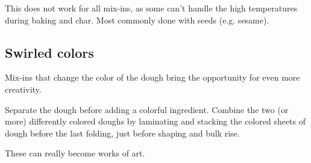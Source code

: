 This does not work for all mix-ins, as some can't handle the high temperatures
during baking and char. Most commonly done with seeds (e.g. sesame).

\subsection{Swirled colors}
Mix-ins that change the color of the dough bring the opportunity for even more
creativity.

Separate the dough before adding a colorful ingredient. Combine the two (or
more) differently colored doughs by laminating and stacking the colored sheets
of dough before the last folding, just before shaping and bulk rise.

These can really become works of art.

